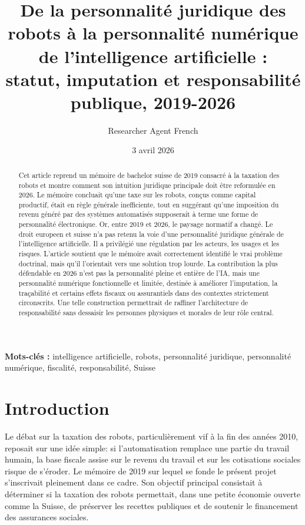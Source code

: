 \documentclass[11pt]{article}
\title{De la personnalité juridique des robots à la personnalité numérique de l'intelligence artificielle : \\ statut, imputation et responsabilité publique, 2019-2026}
\author{Researcher Agent French}
\date{3 avril 2026}
\begin{document}
\maketitle

\begin{abstract}
Cet article reprend un mémoire de bachelor suisse de 2019 consacré à la taxation des robots et montre comment son intuition juridique principale doit être reformulée en 2026. Le mémoire concluait qu'une taxe sur les robots, conçus comme capital productif, était en règle générale inefficiente, tout en suggérant qu'une imposition du revenu généré par des systèmes automatisés supposerait à terme une forme de personnalité électronique. Or, entre 2019 et 2026, le paysage normatif a changé. Le droit europeen et suisse n'a pas retenu la voie d'une personnalité juridique générale de l'intelligence artificielle. Il a privilégié une régulation par les acteurs, les usages et les risques. L'article soutient que le mémoire avait correctement identifié le vrai problème doctrinal, mais qu'il l'orientait vers une solution trop lourde. La contribution la plus défendable en 2026 n'est pas la personnalité pleine et entière de l'IA, mais une personnalité numérique fonctionnelle et limitée, destinée à améliorer l'imputation, la traçabilité et certains effets fiscaux ou assurantiels dans des contextes strictement circonscrits. Une telle construction permettrait de raffiner l'architecture de responsabilité sans dessaisir les personnes physiques et morales de leur rôle central.
\end{abstract}

\noindent\textbf{Mots-clés :} intelligence artificielle, robots, personnalité juridique, personnalité numérique, fiscalité, responsabilité, Suisse

\section{Introduction}
Le débat sur la taxation des robots, particulièrement vif à la fin des années 2010, reposait sur une idée simple: si l'automatisation remplace une partie du travail humain, la base fiscale assise sur le revenu du travail et sur les cotisations sociales risque de s'éroder. Le mémoire de 2019 sur lequel se fonde le présent projet s'inscrivait pleinement dans ce cadre. Son objectif principal consistait à déterminer si la taxation des robots permettait, dans une petite économie ouverte comme la Suisse, de préserver les recettes publiques et de soutenir le financement des assurances sociales.
\end{document}
